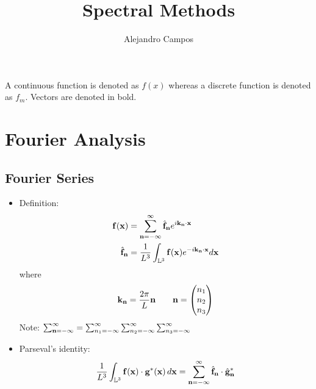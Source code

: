 \documentclass[11pt]{article}
\title{Spectral Methods}
\author{Alejandro Campos}
\begin{document}
\maketitle
\tableofcontents

A continuous function is denoted as $f(x)$ whereas a discrete function is denoted as $f_m$. Vectors are denoted in bold.

\section{Fourier Analysis}
\subsection{Fourier Series}
\begin{itemize}
\item Definition:
\begin{align*}
\mathbf{f}(\mathbf{x}) &= \sum_{\mathbf{n}=-\infty}^\infty \hat{\mathbf{f}}_{\mathbf{n}} e^{ i \mathbf{k}_{\mathbf{n}} \cdot \mathbf{x}} \\
\hat{\mathbf{f}}_{\mathbf{n}} &= \frac{1}{L^3}\int_{\mathbb{L}^3} \mathbf{f}(\mathbf{x})e^{-i\mathbf{k}_{\mathbf{n}} \cdot \mathbf{x}}d\mathbf{x}
\end{align*}
where
\[ \mathbf{k}_{\mathbf{n}} = \frac{2 \pi}{L} \mathbf{n} \qquad \mathbf{n} = \begin{pmatrix} n_1 \\ n_2 \\ n_3 \end{pmatrix}  \]
Note: $ \sum_{\mathbf{n} = -\infty}^{\infty} = \sum_{n_1 = -\infty}^{\infty} \sum_{n_2 = -\infty}^{\infty} \sum_{n_3 = -\infty}^{\infty} $

\item Parseval's identity:
\[ \frac{1}{L^3} \int_{\mathbb{L}^3} \mathbf{f}(\mathbf{x}) \cdot \mathbf{g}^*(\mathbf{x}) \, d\mathbf{x} = \sum_{\mathbf{n} = -\infty}^{\infty} \hat{ \mathbf{f} }_{\mathbf{n}} \cdot \hat{ \mathbf{g} }^*_{\mathbf{n}} \]

\end{itemize}

\end{document}
